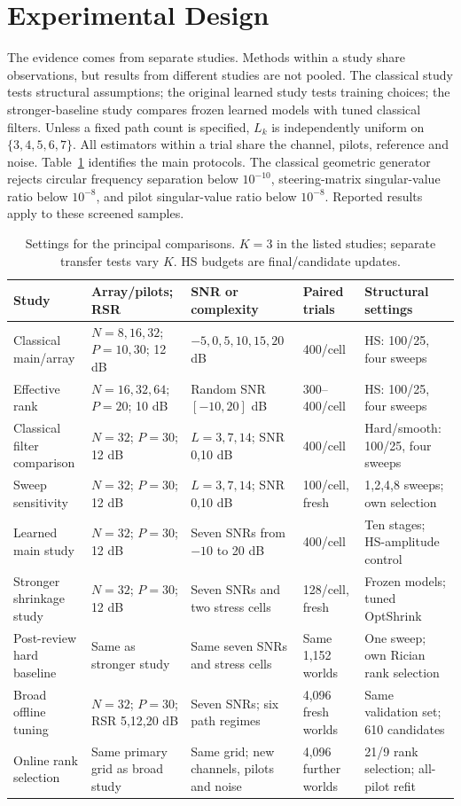 \documentclass[10pt,journal,letterpaper]{IEEEtran}
\begin{document}
\section{Experimental Design}
\label{sec:experiments}
The evidence comes from separate studies. Methods within a study share observations, but results from different studies are not pooled. The classical study tests structural assumptions; the original learned study tests training choices; the stronger-baseline study compares frozen learned models with tuned classical filters. Unless a fixed path count is specified, $L_k$ is independently uniform on $\{3,4,5,6,7\}$. All estimators within a trial share the channel, pilots, reference and noise. Table~\ref{tab:settings} identifies the main protocols. The classical geometric generator rejects circular frequency separation below $10^{-10}$, steering-matrix singular-value ratio below $10^{-8}$, and pilot singular-value ratio below $10^{-8}$. Reported results apply to these screened samples.

\begin{table}[!t]
\caption{Settings for the principal comparisons. $K=3$ in the listed studies; separate transfer tests vary $K$. HS budgets are final/candidate updates.}
\label{tab:settings}\centering\footnotesize
\begin{tabular}{@{}p{1.13in}p{1.33in}p{1.27in}p{0.90in}p{1.16in}@{}}\toprule
Study & Array/pilots; RSR & SNR or complexity & Paired trials & Structural settings\\\midrule
Classical main/array & $N=8,16,32$; $P=10,30$; 12 dB & $-5,0,5,10,15,20$ dB & 400/cell & HS: 100/25, four sweeps\\
Effective rank & $N=16,32,64$; $P=20$; 10 dB & Random SNR $[-10,20]$ dB & 300--400/cell & HS: 100/25, four sweeps\\
Classical filter comparison & $N=32$; $P=30$; 12 dB & $L=3,7,14$; SNR 0,10 dB & 400/cell & Hard/smooth: 100/25, four sweeps\\
Sweep sensitivity & $N=32$; $P=30$; 12 dB & $L=3,7,14$; SNR 0,10 dB & 100/cell, fresh & 1,2,4,8 sweeps; own selection\\
Learned main study & $N=32$; $P=30$; 12 dB & Seven SNRs from $-10$ to 20 dB & 400/cell & Ten stages; HS-amplitude control\\
Stronger shrinkage study & $N=32$; $P=30$; 12 dB & Seven SNRs and two stress cells & 128/cell, fresh & Frozen models; tuned OptShrink\\
Post-review hard baseline & Same as stronger study & Same seven SNRs and stress cells & Same 1,152 worlds & One sweep; own Rician rank selection\\
Broad offline tuning & $N=32$; $P=30$; RSR 5,12,20 dB & Seven SNRs; six path regimes & 4,096 fresh worlds & Same validation set; 610 candidates\\
Online rank selection & Same primary grid as broad study & Same grid; new channels, pilots and noise & 4,096 further worlds & 21/9 rank selection; all-pilot refit\\\bottomrule
\end{tabular}
\end{table}
\end{document}
